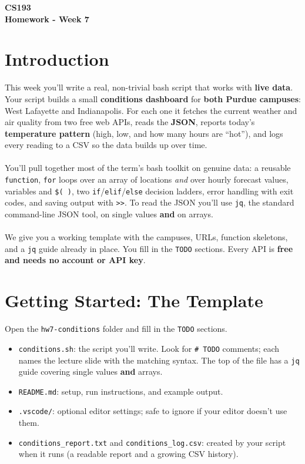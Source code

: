 \documentclass[11pt]{article}
\begin{document}
\begin{center}
    {\Huge \textbf{CS193}} \\
    \vspace{2mm}
    {\Large \textbf{Homework - Week 7}} \\
\end{center}

\section{Introduction}
This week you'll write a real, non-trivial bash script that works with \textbf{live data}. Your script builds a small \textbf{conditions dashboard} for \textbf{both Purdue campuses}: West Lafayette and Indianapolis. For each one it fetches the current weather and air quality from two free web APIs, reads the \textbf{JSON}, reports today's \textbf{temperature pattern} (high, low, and how many hours are ``hot''), and logs every reading to a CSV so the data builds up over time.
\\\\
You'll pull together most of the term's bash toolkit on genuine data: a reusable \texttt{function}, \texttt{for} loops over an array of locations \textit{and} over hourly forecast values, variables and \texttt{\$( )}, two \texttt{if}/\texttt{elif}/\texttt{else} decision ladders, error handling with exit codes, and saving output with \texttt{>{}>}. To read the JSON you'll use \texttt{jq}, the standard command-line JSON tool, on single values \textbf{and} on arrays.
\\\\
We give you a working template with the campuses, URLs, function skeletons, and a \texttt{jq} guide already in place. You fill in the \texttt{TODO} sections. Every API is \textbf{free and needs no account or API key}.

\section{Getting Started: The Template}
Open the \texttt{hw7-conditions} folder and fill in the \texttt{TODO} sections.
\begin{itemize}
    \item \texttt{conditions.sh}: the script you'll write. Look for \texttt{\# TODO} comments; each names the lecture slide with the matching syntax. The top of the file has a \texttt{jq} guide covering single values \textbf{and} arrays.
    \item \texttt{README.md}: setup, run instructions, and example output.
    \item \texttt{.vscode/}: optional editor settings; safe to ignore if your editor doesn't use them.
    \item \texttt{conditions\_report.txt} and \texttt{conditions\_log.csv}: created by your script when it runs (a readable report and a growing CSV history).
\end{itemize}
\end{document}
